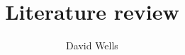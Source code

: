 \documentclass{report}
\begin{document}
\title{Literature review}
\author{David Wells}
\maketitle

\tableofcontents



\end{document}
